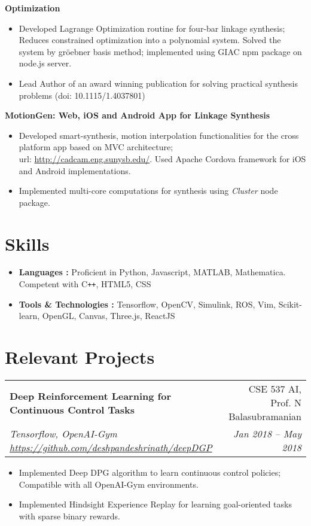 \documentclass[letterpaper,10pt]{article}
\makeatletter
\newcommand{\resumeHeading}[4]{
  \vspace{-1pt}
    \begin{tabular*}{0.97\textwidth}{l@{\extracolsep{\fill}}r}
      \textbf{#1} & #2 \vspace{-2pt}\\ \vspace{1pt}
      \textit{\small#3} & \textit{\small #4} \\
    \end{tabular*}
}
\newcommand{\resumeSubheading}[1]{
      {\small\textbf{#1}} \\
}
\newcommand{\resumeSubheadingNew}[1]{
      {\small{#1}} \\
}
\newcommand{\resumeSection}[1]{
\vspace{-12pt}
\section{\textbf{#1}}
}
\newcommand{\resumeItemListStart}{
\vspace{-7pt}
\begin{itemize}[leftmargin=14pt]
}
\newcommand{\resumeItemListEnd}{
\vspace{+7pt}
\end{itemize}
}
\newcommand{\resumeItem}[1]{
  \item\small{
      {#1 \vspace{-7pt}
      }
  }
}
\makeatother
\begin{document}
      \vspace{-5pt}
      \resumeSubheading{Optimization}
      \resumeItemListStart
        \resumeItem{Developed Lagrange Optimization routine for four-bar linkage synthesis; Reduces constrained optimization into a polynomial system.
          Solved the system by gr\"{o}ebner basis method; implemented using GIAC npm package on node.js server.}
        \resumeItem{Lead Author of an award winning publication for solving practical synthesis problems (doi: 10.1115/1.4037801)}
      \resumeItemListEnd

      \vspace{-5pt}
      \resumeSubheading{MotionGen: Web, iOS and Android App for Linkage Synthesis}
      \resumeItemListStart
        \resumeItem{Developed smart-synthesis, motion interpolation functionalities for the cross platform app based on MVC architecture; \\ url: \href{http://cadcam.eng.sunysb.edu/}{http://cadcam.eng.sunysb.edu/}. Used Apache Cordova framework for iOS and Android implementations.}
        \resumeItem{Implemented multi-core computations for synthesis using \emph{Cluster} node package.}
      \resumeItemListEnd


\resumeSection{Skills}
\vspace{+7pt}
    \resumeItemListStart
      \resumeItem{\textbf{Languages :} Proficient in Python, Javascript, MATLAB, Mathematica. Competent with C\texttt{++}, HTML5, CSS}
      \resumeItem{\textbf{Tools \& Technologies :} Tensorflow, OpenCV, Simulink, ROS, Vim, Scikit-learn, OpenGL, Canvas, Three.js, ReactJS}
    \resumeItemListEnd


    \resumeSection{Relevant Projects}

    \resumeHeading{Deep Reinforcement Learning for Continuous Control Tasks}{CSE 537 AI, Prof. N Balasubramanian}{Tensorflow, OpenAI-Gym \href{https://github.com/deshpandeshrinath/deepDGP}{https://github.com/deshpandeshrinath/deepDGP}}{Jan 2018 -- May 2018}
    \resumeItemListStart
      \resumeItem{Implemented Deep DPG algorithm to learn continuous control policies; Compatible with all OpenAI-Gym environments.}
      \resumeItem{Implemented Hindsight Experience Replay for learning goal-oriented tasks with sparse binary rewards.}
    \resumeItemListEnd
\end{document}
